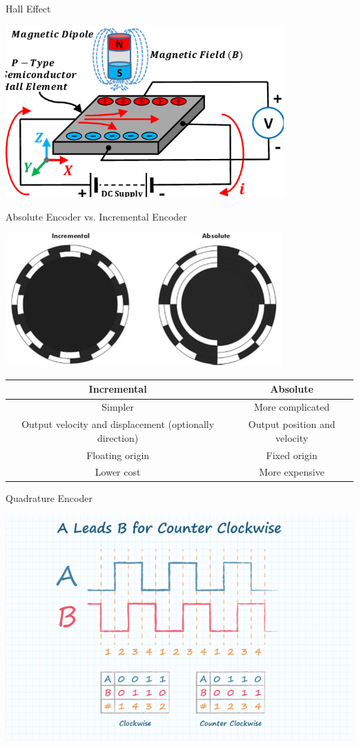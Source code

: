 \documentclass[12pt,letterpaper]{beamer}
\begin{document}
\begin{frame}{Hall Effect}

\centering
\includegraphics[width=0.8\textwidth]{hall_effect}

\end{frame}

\begin{frame}{Absolute Encoder vs. Incremental Encoder}

    \centering
    \includegraphics[width=0.6\linewidth]{absolute_incremental}

    {\scriptsize
    \begin{tabular}{ cc }
        \hline
        \textbf{Incremental} & \textbf{Absolute} \\
        \hline
        Simpler & More complicated \\
        Output velocity and displacement (optionally direction) & Output position and velocity \\
        Floating origin & Fixed origin \\
        Lower cost & More expensive \\
        \hline
    \end{tabular}
}
    
\end{frame}

\begin{frame}{Quadrature Encoder}
    
    \centering
    \includegraphics[width=0.8\linewidth]{quadrature}

\end{frame}
\end{document}
